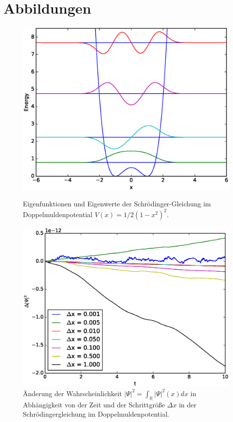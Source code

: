 \documentclass[a4paper, 11pt]{scrartcl}
\begin{document}
\newpage
\section{Abbildungen}
\begin{figure}[H]
\centering
\includegraphics[width = .75\textwidth]{eigenfunctions}
\caption{Eigenfunktionen und Eigenwerte der Schrödinger-Gleichung im Doppelmuldenpotential $V(x) = 1/2(1-x^2)^2$.}
\label{fig:eigenfunction}
%
\includegraphics[width = .75\textwidth]{probability}
\caption{Änderung der Wahrscheinlichkeit $\vert \Psi \vert^2 = \int_{\mathds{R}} \vert \Psi \vert^2(x) dx$ in Abhängigkeit von der Zeit und der Schrittgröße $\Delta x$ in der Schrödingergleichung im Doppelmuldenpotential.}
\label{fig:prob}
\end{figure}
%
\end{document}
